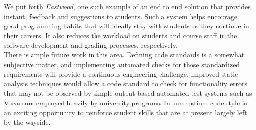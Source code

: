 \documentclass[sigconf]{acmart}
\begin{document}
We put forth \textit{Eastwood}, one such example of an end to end solution that provides
instant, feedback and suggestions to students. Such a system helps encourage good 
programming habits that will ideally stay with students as they continue in their 
careers. It also reduces the workload on students and course staff in the software
development and grading processes, respectively.
\\

There is ample future work in this area. Defining code standards is a somewhat
subjective matter, and implementing automated checks for those standardized
requirements will provide a continuous engineering challenge. Improved static analysis
techniques would allow a code standard to check for functionality errors that may not be
observed by simple output-based automated test systems such as Vocareum employed heavily 
by university programs. In summation: code style is an exciting opportunity to reinforce
student skills that are at present largely left by the wayside.
\\



\end{document}
